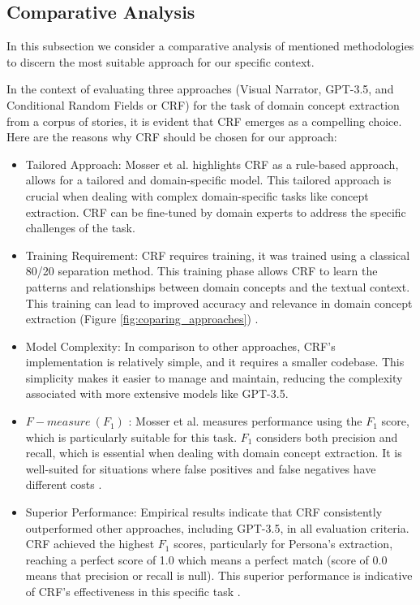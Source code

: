\subsection{Comparative Analysis} \label{comparative_analysis}
In this subsection we consider a comparative analysis of mentioned methodologies to discern the most suitable approach for our specific context.

In the context of evaluating three approaches (Visual Narrator, GPT-3.5, and Conditional Random Fields or CRF) for the task of domain concept extraction from a corpus of stories, it is evident that CRF emerges as a compelling choice. Here are the reasons why CRF should be chosen for our approach:
\begin{itemize}
\item Tailored Approach: Mosser et al. highlights CRF as a rule-based approach, allows for a tailored and domain-specific model. This tailored approach is crucial when dealing with complex domain-specific tasks like concept extraction. CRF can be fine-tuned by domain experts to address the specific challenges of the task.
\item Training Requirement: CRF requires training, it was trained using a classical 80/20 separation method. This training phase allows CRF to learn the patterns and relationships between domain concepts and the textual context. This training can lead to improved accuracy and relevance in domain concept extraction (Figure \ref{fig:coparing_approaches}) \cite{arulmohan2023extracting}.
\item Model Complexity: In comparison to other approaches, CRF's implementation is relatively simple, and it requires a smaller codebase. This simplicity makes it easier to manage and maintain, reducing the complexity associated with more extensive models like GPT-3.5.
\item $F-measure\ (F_1)$ : Mosser et al. measures performance using the $F_1$ score, which is particularly suitable for this task. $F_1$ considers both precision and recall, which is essential when dealing with domain concept extraction. It is well-suited for situations where false positives and false negatives have different costs \cite{arulmohan2023extracting}.
\item Superior Performance: Empirical results indicate that CRF consistently outperformed other approaches, including GPT-3.5, in all evaluation criteria. CRF achieved the highest $F_1$ scores, particularly for Persona's extraction, reaching a perfect score of 1.0 which means a perfect match (score of 0.0 means that precision or recall is null). This superior performance is indicative of CRF's effectiveness in this specific task \cite{arulmohan2023extracting}.

\end{itemize}
